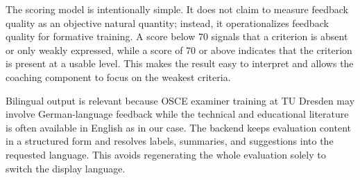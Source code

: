 The scoring model is intentionally simple. It does not claim to measure feedback
quality as an objective natural quantity; instead, it operationalizes feedback
quality for formative training. A score below 70 signals that a criterion is
absent or only weakly expressed, while a score of 70 or above indicates that the
criterion is present at a usable level. This makes the result easy to interpret
and allows the coaching component to focus on the weakest criteria.

Bilingual output is relevant because OSCE examiner training at TU Dresden may
involve German-language feedback while the technical and educational literature
is often available in English as in our case. The backend keeps evaluation content in
a structured form and resolves labels, summaries, and suggestions into the
requested language. This avoids regenerating the whole evaluation solely to
switch the display language.
